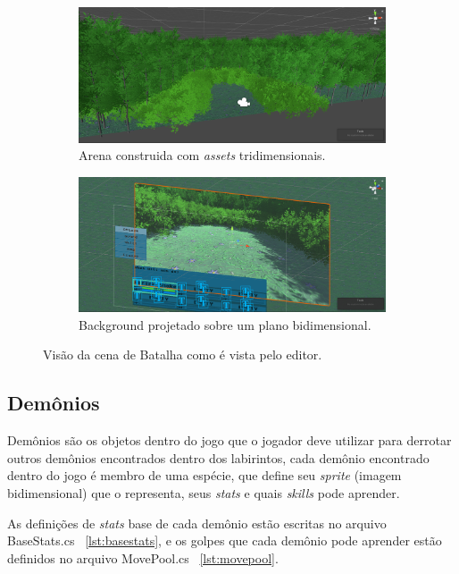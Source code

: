 \begin{figure}[h!]
  \centering
  \begin{subfigure}[b]{0.75\linewidth}
    \includegraphics[width=\linewidth]{arena.png}
     \caption{Arena construida com \emph{assets} tridimensionais.}
  \end{subfigure}
  \begin{subfigure}[b]{0.75\linewidth}
    \includegraphics[width=\linewidth]{background.png}
    \caption{Background projetado sobre um plano bidimensional.}
  \end{subfigure}
  \caption{Visão da cena de Batalha como é vista pelo editor.}
  \label{fig:background}
\end{figure}


\subsection{Demônios}

	Demônios são os objetos dentro do jogo que o jogador deve utilizar para derrotar outros demônios encontrados dentro dos labirintos, cada demônio encontrado dentro do jogo é membro de uma espécie, que define seu \emph{sprite} (imagem bidimensional) que o representa, seus \emph{stats} e quais \emph{skills} pode aprender.
	
	As definições de \emph{stats} base de cada demônio estão escritas no arquivo BaseStats.cs ~\ref{lst:basestats}, e os golpes que cada demônio pode aprender estão definidos no arquivo MovePool.cs ~\ref{lst:movepool}.
	

